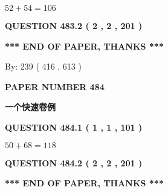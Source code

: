 \documentclass{ctexart}
\begin{document}
  
 
 

$ %
52 +  %
54=   %
106$
 
 
  
\vspace{0.2in}
  
{\textbf{\Large{QUESTION
483.2 
 ( 2 , 2 , 201 )
}}}
  
  
   
   
 \vspace{0.2in}
 
   
   
   
   
\vspace{1.0in} 
{\textbf{\large{ *** END OF PAPER, THANKS *** }}} 
   
   
\hspace{1.0in} By: 
 239 ( 416 ,  613 )
   
   
   
   
\newpage 
\setcounter{page}{ 
   484001 } 
   
   
   
   
 {\textbf{ \Large{ PAPER NUMBER  484  }}}
   
   
\vspace{0.2in}
   
   
   
   
   
   
 \vspace{0.2in}
{\LARGE {\textbf{ 一个快速卷例}}}
   
   
  
\vspace{0.2in}
  
{\textbf{\Large{QUESTION
484.1 
 ( 1 , 1 , 101 )
}}}
  
  
 
 

$ %
50 +  %
68=   %
118$
 
 
  
\vspace{0.2in}
  
{\textbf{\Large{QUESTION
484.2 
 ( 2 , 2 , 201 )
}}}
  
  
   
   
 \vspace{0.2in}
 
   
   
   
   
\vspace{1.0in} 
{\textbf{\large{ *** END OF PAPER, THANKS *** }}} 
   
\end{document}
